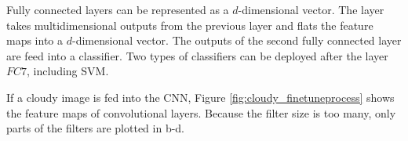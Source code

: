 Fully connected layers can be represented as a $d$-dimensional vector. The layer takes multidimensional outputs from the previous layer and flats the feature maps into a $d$-dimensional vector. The outputs of the second fully connected layer are feed into a classifier. Two types of classifiers can be deployed after the layer $FC7$, including SVM.

If a cloudy image is fed into the CNN, Figure \ref{fig:cloudy_finetuneprocess} shows the feature maps of convolutional layers. Because the filter size is too many, only parts of the filters are plotted in b-d.

\graphicspath{ {./Figures/DifferentLayers/} }

\begin{figure}[htb]
    \centering
\end{figure}
